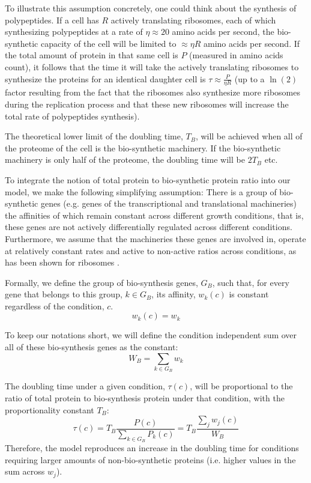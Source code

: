 \documentclass{article}
\begin{document}
To illustrate this assumption concretely, one could think about the synthesis of polypeptides.
If a cell has $R$ actively translating ribosomes, each of which synthesizing polypeptides at a rate of $\eta \approx 20$ amino acids per second, the bio-synthetic capacity of the cell will be limited to $\approx \eta R$ amino acids per second.
If the total amount of protein in that same cell is $P$ (measured in amino acids count), it follows that the time it will take the actively translating ribosomes to synthesize the proteins for an identical daughter cell is $\tau \approx \frac{P}{\eta R}$ (up to a $\ln(2)$ factor resulting from the fact that the ribosomes also synthesize more ribosomes during the replication process and that these new ribosomes will increase the total rate of polypeptides synthesis).


The theoretical lower limit of the doubling time, $T_B$, will be achieved when all of the proteome of the cell is the bio-synthetic machinery.
If the bio-synthetic machinery is only half of the proteome, the doubling time will be $2T_B$ etc.

To integrate the notion of total protein to bio-synthetic protein ratio into our model, we make the following simplifying assumption:
There is a group of bio-synthetic genes (e.g. genes of the transcriptional and translational machineries) the affinities of which remain constant across different growth conditions, that is, these genes are not actively differentially regulated across different conditions.
Furthermore, we assume that the machineries these genes are involved in, operate at relatively constant rates and active to non-active ratios across conditions, as has been shown for ribosomes \cite{Bremer1987}.

Formally, we define the group of bio-synthesis genes, $G_B$, such that, for every gene that belongs to this group, $k \in G_B$, its affinity, $w_k(c)$ is constant regardless of the condition, $c$.
\begin{equation}
  \label{eq:biosynth-def}
  w_k(c)=w_k
\end{equation}

To keep our notations short, we will define the condition independent sum over all of these bio-synthesis genes as the constant:
\[
W_B = \sum_{k\in G_B}w_k
\]

The doubling time under a given condition, $\tau(c)$, will be proportional to the ratio of total protein to bio-synthesis protein under that condition, with the proportionality constant $T_B$:
\begin{equation}
  \label{eq:gr-ratio}
  \tau(c) = T_B\frac{P(c)}{\sum_{k\in G_B}P_k(c)}=T_B\frac{\sum_jw_j(c)}{W_B}
\end{equation}
Therefore, the model reproduces an increase in the doubling time for conditions requiring larger amounts of non-bio-synthetic proteins (i.e. higher values in the sum across $w_j$).
\end{document}
